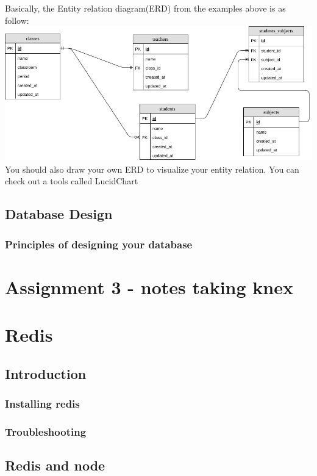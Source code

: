 \documentclass[a4paper]{article}
\begin{document}
Basically, the Entity relation diagram(ERD) from the examples above is as follow:\\
\includegraphics[scale = 0.5]{img/school_entities.png}
You should also draw your own ERD to visualize your entity relation. You can check out a tools called LucidChart
\subsection{Database Design}
\subsubsection{Principles of designing your database}




\section{Assignment 3 - notes taking knex}

\section{Redis}
\subsection{Introduction}
\subsubsection{Installing redis}
\subsubsection{Troubleshooting}

\subsection{Redis and node}
\end{document}
